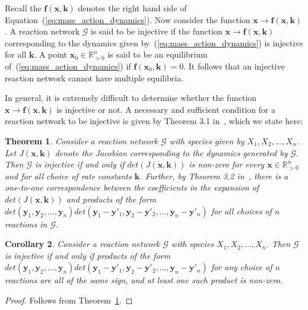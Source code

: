 \documentclass[11pt]{article}
\theoremstyle{plain}
\newtheorem{theorem}{Theorem}[section]
\newtheorem{corollary}[theorem]{Corollary}
\theoremstyle{definition}
\theoremstyle{remark}
\newcommand\f{\boldsymbol{f}}
\newcommand\bk{\boldsymbol{k}}
\newcommand\x{\boldsymbol{x}}
\newcommand\y{\boldsymbol{y}}
\newcommand\GG{\mathcal{G}}
\begin{document}
Recall the $\f(\x,\bk)$ denotes the right hand side of Equation~(\ref{eq:mass_action_dynamics}). Now consider the function $\x\rightarrow \f(\x,\bk)$. A reaction network $\GG$ is said to be injective if the function $\x\rightarrow \f(\x,\bk)$ corresponding to the dynamics given by~(\ref{eq:mass_action_dynamics}) is injective for all $\bk$. A point $\x_0\in\mathbb{R}^n_{>0}$ is said to be an equilibrium of~(\ref{eq:mass_action_dynamics}) if $\f(\x_0,\bk)=0$. It follows that an injective reaction network cannot have multiple equilibria.

In general, it is extremely difficult to determine whether the function $\x\rightarrow \f(\x,\bk)$ is injective or not. A necessary and sufficient condition for a reaction network to be injective is given by Theorem 3.1 in~\cite{craciun2005multiple}, which we state here:

\begin{theorem}\label{thm:injectivity}
Consider a reaction network $\GG$ with species given by $X_1,X_2,...,X_n$. Let $J(\x,\bk)$ denote the Jacobian corresponding to the dynamics generated by $\GG$. Then $\GG$ is injective if and only if $det(J(\x,\bk))$ is non-zero for every $\x\in\mathbb{R}^n_{>0}$ and for all choice of rate constants $\bk$. Further, by Theorem 3.2 in~\cite{craciun2005multiple}, there is a one-to-one correspondence between the coefficients in the expansion of $det(J(\x,\bk))$ and products of the form $det(\y_1,\y_2,...,\y_n)det(\y_1-\y'_1,\y_2-\y'_2,...,\y_n-\y'_n)$ for all choices of $n$ reactions in $\GG$.
\end{theorem}
%

\begin{corollary}\label{cor:injectivity}
Consider a reaction network $\GG$ with species $X_1,X_2,...,X_n$. Then $\GG$ is injective if and only if products of the form $det(\y_1,\y_2,...,\y_n)det(\y_1-\y'_1,\y_2-\y'_2,...,\y_n-\y'_n)$ for any choice of $n$ reactions are all of the same sign, and at least one such product is non-zero.
\end{corollary}

\begin{proof}
Follows from Theorem~\ref{thm:injectivity}.
\end{proof}
\end{document}
